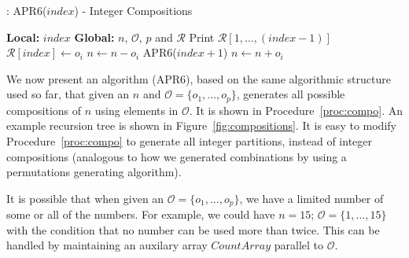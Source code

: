 \documentclass{article}
\begin{document}
\begin{algorithm}
\begin{algorithmic}[1]
\caption{: APR6($index$) - Integer Compositions}
\label{proc:compo}
\STATE \textbf{Local:} $index$
\STATE \textbf{Global:} $n$, $\mathcal{O}$, $p$ and $\mathcal{R}$
\medskip
{}
	\STATE Print $\mathcal{R}[1, \ldots, (index-1)]$
	\RETURN
\ELSE
			\STATE $\mathcal{R}[index] \gets o_i$ 
			\STATE $n \gets n - o_i$
			\STATE APR6($index + 1$)
			\STATE $n \gets n + o_i$
		\ENDIF
	\ENDFOR
\ENDIF
\end{algorithmic}
\end{algorithm}

We now present an algorithm (APR6), based on the same algorithmic structure used so far, that given an $n$ and $\mathcal{O}=\{o_1,\ldots,o_p\}$, generates all possible compositions of $n$ using elements in $\mathcal{O}$. It is shown in Procedure~\ref{proc:compo}. An example recursion tree is shown in Figure~\ref{fig:compositions}. It is easy to modify Procedure~\ref{proc:compo} to generate all integer partitions, instead of integer compositions (analogous to how we generated combinations by using a permutations generating algorithm).

It is possible that when given an $\mathcal{O}=\{o_1,\ldots,o_p\}$, we have a limited number of some or all of the numbers. For example, we could have $n=15$; $\mathcal{O}=\{1,\ldots,15\}$ with the condition that no number can be used more than twice. This can be handled by maintaining an auxilary array $CountArray$ parallel to $\mathcal{O}$.
\end{document}

